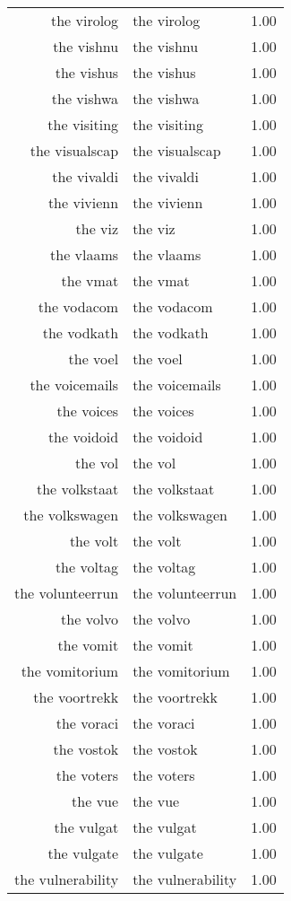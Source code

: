 \begin{table}[ht]
\begin{tabular}{rlr}
  the virolog & the virolog & 1.00 \\ 
  the vishnu & the vishnu & 1.00 \\ 
  the vishus & the vishus & 1.00 \\ 
  the vishwa & the vishwa & 1.00 \\ 
  the visiting & the visiting & 1.00 \\ 
  the visualscap & the visualscap & 1.00 \\ 
  the vivaldi & the vivaldi & 1.00 \\ 
  the vivienn & the vivienn & 1.00 \\ 
  the viz & the viz & 1.00 \\ 
  the vlaams & the vlaams & 1.00 \\ 
  the vmat & the vmat & 1.00 \\ 
  the vodacom & the vodacom & 1.00 \\ 
  the vodkath & the vodkath & 1.00 \\ 
  the voel & the voel & 1.00 \\ 
  the voicemails & the voicemails & 1.00 \\ 
  the voices & the voices & 1.00 \\ 
  the voidoid & the voidoid & 1.00 \\ 
  the vol & the vol & 1.00 \\ 
  the volkstaat & the volkstaat & 1.00 \\ 
  the volkswagen & the volkswagen & 1.00 \\ 
  the volt & the volt & 1.00 \\ 
  the voltag & the voltag & 1.00 \\ 
  the volunteerrun & the volunteerrun & 1.00 \\ 
  the volvo & the volvo & 1.00 \\ 
  the vomit & the vomit & 1.00 \\ 
  the vomitorium & the vomitorium & 1.00 \\ 
  the voortrekk & the voortrekk & 1.00 \\ 
  the voraci & the voraci & 1.00 \\ 
  the vostok & the vostok & 1.00 \\ 
  the voters & the voters & 1.00 \\ 
  the vue & the vue & 1.00 \\ 
  the vulgat & the vulgat & 1.00 \\ 
  the vulgate & the vulgate & 1.00 \\ 
  the vulnerability & the vulnerability & 1.00 \\ 

\end{tabular}
\end{table}
